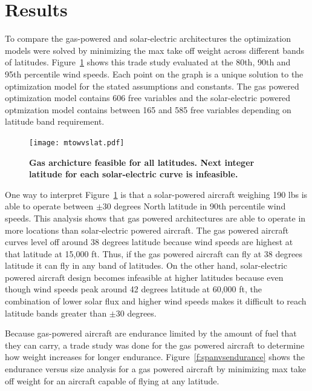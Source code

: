 \section{Results}

To compare the gas-powered and solar-electric architectures the optimization models were solved by minimizing the max take off weight across different bands of latitudes. Figure~\ref{f:latvsmtowtrade} shows this trade study evaluated at the 80th, 90th and 95th percentile wind speeds.  
Each point on the graph is a unique solution to the optimization model for the stated assumptions and constants.
The gas powered optimization model contains 606 free variables and the solar-electric powered optmization model contains between 165 and 585 free variables depending on latitude band requirement. 

\begin{figure}[H]
	\begin{center}
	\texttt{[image: mtowvslat.pdf]}
    \caption{\textbf{Gas archicture feasible for all latitudes. Next integer latitude for each solar-electric curve is infeasible.}}
    \label{f:latvsmtowtrade}
	\end{center}
\end{figure}

One way to interpret Figure~\ref{f:latvsmtowtrade} is that a solar-powered aircraft weighing 190 lbs is able to operate between $\pm$30 degrees North latitude in 90th percentile wind speeds.  
This analysis shows that gas powered architectures are able to operate in more locations than solar-electric powered aircraft.  
The gas powered aircraft curves level off around 38 degrees latitude because wind speeds are highest at that latitude at 15,000 ft. 
Thus, if the gas powered aircraft can fly at 38 degrees latitude it can fly in any band of latitudes.  
On the other hand, solar-electric powered aircraft design becomes infeasible at higher latitudes because even though wind speeds peak around 42 degrees latitude at 60,000 ft, the combination of lower solar flux and higher wind speeds makes it difficult to reach latitude bands greater than $\pm$30 degrees. 

Because gas-powered aircraft are endurance limited by the amount of fuel that they can carry, a trade study was done for the gas powered aircraft to determine how weight increases for longer endurance.
Figure~\ref{f:spanvsendurance} shows the endurance versus size analysis for a gas powered aircraft by minimizing max take off weight for an aircraft capable of flying at any latitude. 

